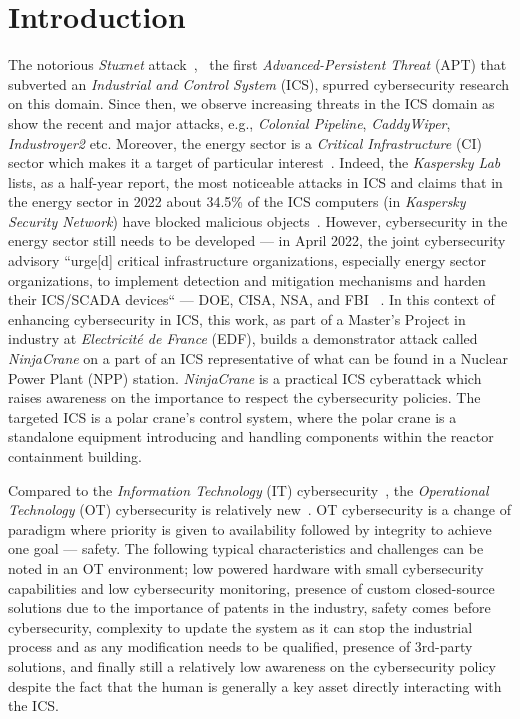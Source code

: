 \chapter{Introduction}

The notorious \emph{Stuxnet} attack~\cite{LangnerStuxnet},~\cite{SymantecStuxnet} the first \emph{Advanced-Persistent Threat} (APT) that subverted an \emph{Industrial and Control System} (ICS), spurred cybersecurity research on this domain. Since then, we observe increasing threats in the ICS domain as show the recent and major attacks, e.g., \emph{Colonial Pipeline}, \emph{CaddyWiper}, \emph{Industroyer2} etc. Moreover, the energy sector is a \emph{Critical Infrastructure} (CI) sector which makes it a target of particular interest~\cite{cisaCI}. Indeed, the \emph{Kaspersky Lab} lists, as a half-year report, the most noticeable attacks in ICS and claims that in the energy sector in 2022 about 34.5\% of the ICS computers (in \emph{Kaspersky Security Network}) have blocked malicious objects~\cite{KasperskyReport}. However, cybersecurity in the energy sector still needs to be developed — in April 2022, the joint cybersecurity advisory ``urge[d] critical infrastructure organizations, especially energy sector organizations, to implement detection and mitigation mechanisms and harden their ICS/SCADA devices`` — DOE, CISA, NSA, and FBI ~\cite{CSA22}. In this context of enhancing cybersecurity in ICS, this work, as part of a Master's Project in industry at \emph{Electricité de France} (EDF), builds a demonstrator attack called \emph{NinjaCrane} on a part of an ICS representative of what can be found in a Nuclear Power Plant (NPP) station. \emph{NinjaCrane} is a practical ICS cyberattack which raises awareness on the importance to respect the cybersecurity policies. The targeted ICS is a polar crane's control system, where the polar crane is a standalone equipment introducing and handling components within the reactor containment building. 


Compared to the \emph{Information Technology} (IT) cybersecurity~\cite{nistIT}, the \emph{Operational Technology} (OT) cybersecurity is relatively new~\cite{nistOT}. OT cybersecurity is a change of paradigm where priority is given to availability followed by integrity to achieve one goal — safety. The following typical characteristics and challenges can be noted in an OT environment; low powered hardware with small cybersecurity capabilities and low cybersecurity monitoring, presence of custom closed-source solutions due to the importance of patents in the industry, safety comes before cybersecurity, complexity to update the system as it can stop the industrial process and as any modification needs to be qualified, presence of 3rd-party solutions, and finally still a relatively low awareness on the cybersecurity policy despite the fact that the human is generally a key asset directly interacting with the ICS.

